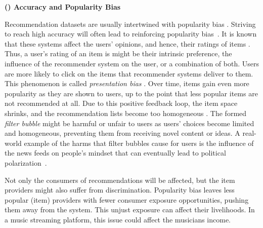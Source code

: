 

\vspace{0.25cm}
\noindent \textbf{() Accuracy and Popularity Bias}
\vspace{0.25cm}

Recommendation datasets are usually intertwined with popularity bias \cite{celma2008hits,lee2014fairness}. Striving to reach high accuracy will often lead to reinforcing popularity bias~\cite{barocas2016big}. It is known that these systems affect the users’ opinions, and hence, their ratings of items \cite{Cosley2003Influence}. Thus, a user’s rating of an item is might be their intrinsic preference, the influence of the recommender system on the user, or a combination of both. Users are more likely to click on the items that recommender systems deliver to them. This phenomenon is called \textit{presentation bias} \cite{baeza2018bias}. 
Over time, items gain even more popularity as they are shown to users, up to the point that less popular items are not recommended at all. Due to this positive feedback loop, the item space shrinks, and the recommendation lists become too homogeneous \cite{Chaney2018Homogeneity}. The formed \textit{filter bubble} might be harmful or unfair to users as users' choices become limited and homogeneous, preventing them from receiving novel content or ideas. A real-world example of the harms that filter bubbles cause for users is the influence of the news feeds on people's mindset that can eventually lead to political polarization~\cite{HONG2016777}.


Not only the consumers of recommendations will be affected, but the item providers might also suffer from discrimination. Popularity bias leaves less popular (item) providers with fewer consumer exposure opportunities, pushing them away from the system. This unjust exposure can affect their livelihoods. In a music streaming platform, this issue could affect the musicians income. 

